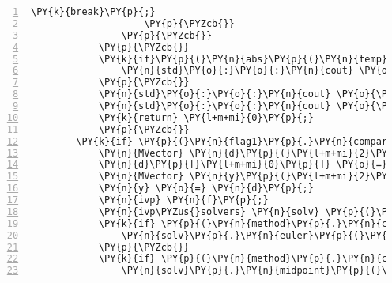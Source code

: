 \begin{Verbatim}[tabsize=2,commandchars=\\\{\},numbers=left,firstnumber=1,stepnumber=1]
						\PY{k}{break}\PY{p}{;}
					\PY{p}{\PYZcb{}}
				\PY{p}{\PYZcb{}}
			\PY{p}{\PYZcb{}}
			\PY{k}{if}\PY{p}{(}\PY{n}{abs}\PY{p}{(}\PY{n}{temp}\PY{p}{[}\PY{l+m+mi}{1}\PY{p}{]}\PY{p}{)}\PY{o}{\PYZgt{}}\PY{l+m+mf}{1.}\PY{p}{)}\PY{p}{\PYZob{}} \PY{c+c1}{// deal with being unable to find the root}
				\PY{n}{std}\PY{o}{:}\PY{o}{:}\PY{n}{cout} \PY{o}{\PYZlt{}}\PY{o}{\PYZlt{}} \PY{l+s}{\PYZdq{}}\PY{l+s}{A root was not found during the shooting method. Something is probably wrong.}\PY{l+s}{\PYZdq{}} \PY{o}{\PYZlt{}}\PY{o}{\PYZlt{}} \PY{n}{std}\PY{o}{:}\PY{o}{:}\PY{n}{endl}\PY{p}{;}
			\PY{p}{\PYZcb{}}
			\PY{n}{std}\PY{o}{:}\PY{o}{:}\PY{n}{cout} \PY{o}{\PYZlt{}}\PY{o}{\PYZlt{}} \PY{l+s}{\PYZdq{}}\PY{l+s}{y(x): }\PY{l+s}{\PYZdq{}} \PY{o}{\PYZlt{}}\PY{o}{\PYZlt{}} \PY{n}{y}\PY{p}{[}\PY{l+m+mi}{0}\PY{p}{]} \PY{o}{\PYZlt{}}\PY{o}{\PYZlt{}} \PY{n}{std}\PY{o}{:}\PY{o}{:}\PY{n}{endl}\PY{p}{;} \PY{c+c1}{// output the important values}
			\PY{n}{std}\PY{o}{:}\PY{o}{:}\PY{n}{cout} \PY{o}{\PYZlt{}}\PY{o}{\PYZlt{}} \PY{l+s}{\PYZdq{}}\PY{l+s}{y\PYZsq{}(x): }\PY{l+s}{\PYZdq{}} \PY{o}{\PYZlt{}}\PY{o}{\PYZlt{}} \PY{n}{y}\PY{p}{[}\PY{l+m+mi}{1}\PY{p}{]} \PY{o}{\PYZlt{}}\PY{o}{\PYZlt{}} \PY{n}{std}\PY{o}{:}\PY{o}{:}\PY{n}{endl}\PY{p}{;}
			\PY{k}{return} \PY{l+m+mi}{0}\PY{p}{;}
			\PY{p}{\PYZcb{}}
		\PY{k}{if} \PY{p}{(}\PY{n}{flag1}\PY{p}{.}\PY{n}{compare}\PY{p}{(}\PY{l+s}{\PYZdq{}}\PY{l+s}{\PYZhy{}i}\PY{l+s}{\PYZdq{}}\PY{p}{)} \PY{o}{=}\PY{o}{=} \PY{l+m+mi}{0}\PY{p}{)}\PY{p}{\PYZob{}}
			\PY{n}{MVector} \PY{n}{d}\PY{p}{(}\PY{l+m+mi}{2}\PY{p}{)}\PY{p}{;} 
			\PY{n}{d}\PY{p}{[}\PY{l+m+mi}{0}\PY{p}{]} \PY{o}{=} \PY{l+m+mi}{17}\PY{p}{;} \PY{n}{d}\PY{p}{[}\PY{l+m+mi}{1}\PY{p}{]} \PY{o}{=} \PY{l+m+mi}{1}\PY{p}{;}
			\PY{n}{MVector} \PY{n}{y}\PY{p}{(}\PY{l+m+mi}{2}\PY{p}{)}\PY{p}{;}
			\PY{n}{y} \PY{o}{=} \PY{n}{d}\PY{p}{;}
			\PY{n}{ivp} \PY{n}{f}\PY{p}{;}
			\PY{n}{ivp\PYZus{}solvers} \PY{n}{solv} \PY{p}{(}\PY{n}{steps}\PY{p}{,} \PY{l+m+mf}{1.}\PY{p}{,} \PY{l+m+mf}{3.}\PY{p}{)}\PY{p}{;}
			\PY{k}{if} \PY{p}{(}\PY{n}{method}\PY{p}{.}\PY{n}{compare}\PY{p}{(}\PY{l+s}{\PYZdq{}}\PY{l+s}{euler}\PY{l+s}{\PYZdq{}}\PY{p}{)} \PY{o}{=}\PY{o}{=} \PY{l+m+mi}{0}\PY{p}{)}\PY{p}{\PYZob{}}
				\PY{n}{solv}\PY{p}{.}\PY{n}{euler}\PY{p}{(}\PY{n}{y}\PY{p}{,} \PY{n}{f}\PY{p}{,} \PY{n}{j}\PY{p}{)}\PY{p}{;}
			\PY{p}{\PYZcb{}}
			\PY{k}{if} \PY{p}{(}\PY{n}{method}\PY{p}{.}\PY{n}{compare}\PY{p}{(}\PY{l+s}{\PYZdq{}}\PY{l+s}{midpoint}\PY{l+s}{\PYZdq{}}\PY{p}{)} \PY{o}{=}\PY{o}{=} \PY{l+m+mi}{0}\PY{p}{)}\PY{p}{\PYZob{}}
				\PY{n}{solv}\PY{p}{.}\PY{n}{midpoint}\PY{p}{(}\PY{n}{y}\PY{p}{,} \PY{n}{f}\PY{p}{,} \PY{n}{j}\PY{p}{)}\PY{p}{;}

\end{Verbatim}
